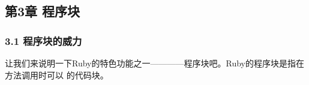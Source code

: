 \documentclass[11pt]{ctexart}
\begin{document}
\subsection{第3章 程序块}
\label{sec:orgd262d1c}
\subsubsection{3.1 程序块的威力}
\label{sec:org3f59a11}

让我们来说明一下Ruby的特色功能之一————程序块吧。Ruby的程序块是指在方法调用时可以
的代码块。
\end{document}

